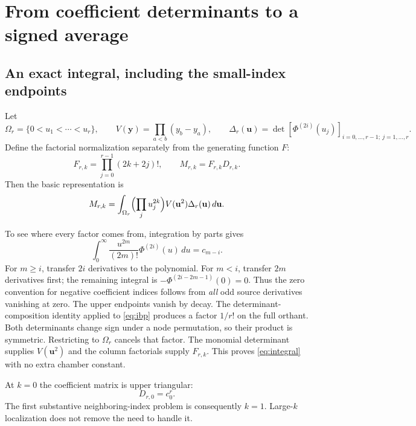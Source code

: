 \documentclass[11pt,letterpaper]{article}
\numberwithin{equation}{section}
\theoremstyle{remark}
\newcommand{\dd}{\,d}
\begin{document}
\section{From coefficient determinants to a signed average}
\label{sec:integral}

\subsection{An exact integral, including the small-index endpoints}

Let
\[
 \Omega_r=\{0<u_1<\cdots<u_r\},\qquad
 V(\mathbf y)=\prod_{a<b}(y_b-y_a),\qquad
 \Delta_r(\mathbf u)=\det[\Phi^{(2i)}(u_j)]_{i=0,\ldots,r-1;\ j=1,\ldots,r}.
\]
Define the factorial normalization separately from the generating
function $F$:
\begin{equation}
 F_{r,k}=\prod_{j=0}^{r-1}(2k+2j)!,\qquad
 M_{r,k}=F_{r,k}D_{r,k}. \label{eq:factorial}
\end{equation}
Then the basic representation is
\begin{equation}
 M_{r,k}=\int_{\Omega_r}\Bigl(\prod_j u_j^{2k}\Bigr)
                    V(\mathbf u^2)\Delta_r(\mathbf u)\dd\mathbf u.
 \label{eq:integral}
\end{equation}

To see where every factor comes from, integration by parts gives
\begin{equation}
 \int_0^\infty\frac{u^{2m}}{(2m)!}\Phi^{(2i)}(u)\dd u=c_{m-i}.
 \label{eq:ibp}
\end{equation}
For $m\ge i$, transfer $2i$ derivatives to the polynomial. For $m<i$,
transfer $2m$ derivatives first; the remaining integral is
$-\Phi^{(2i-2m-1)}(0)=0$. Thus the zero convention for negative
coefficient indices follows from \emph{all} odd source derivatives
vanishing at zero. The upper endpoints vanish by decay.
The determinant-composition identity applied to \eqref{eq:ibp}
produces a factor $1/r!$ on the full orthant. Both determinants change
sign under a node permutation, so their product is symmetric. Restricting
to $\Omega_r$ cancels that factor. The monomial determinant supplies
$V(\mathbf u^2)$ and the column factorials supply $F_{r,k}$.
This proves \eqref{eq:integral} with no extra chamber constant.

At $k=0$ the coefficient matrix is upper triangular:
\begin{equation}
 D_{r,0}=c_0^r. \label{eq:anchor}
\end{equation}
The first substantive neighboring-index problem is consequently $k=1$.
Large-$k$ localization does not remove the need to handle it.
\end{document}

